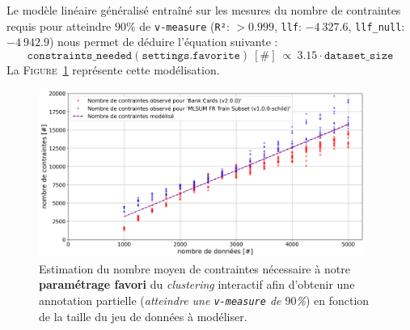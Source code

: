 			Le modèle linéaire généralisé entraîné sur les mesures du nombre de contraintes requis pour atteindre $90$\% de \texttt{v-measure} (\texttt{R²}: $> 0.999$, \texttt{llf}: $-4~327.6$, \texttt{llf\_null}: $-4~942.9$) nous permet de déduire l'équation suivante :
			\begin{equation}
				\label{equation:4.3.3-ETUDE-COUT-NOMBRE-CONTRAINTES}
				\texttt{constraints\_needed}(\texttt{settings.favorite})~[\#]~
				\propto~3.15 \cdot \texttt{dataset\_size}
			\end{equation}
			La \textsc{Figure~\ref{figure:4.3.3-ETUDE-COUT-NOMBRE-CONTRAINTES}} représente cette modélisation.
			\newline
			\begin{figure}[!htb]
				\centering
				\includegraphics[width=0.95\textwidth]{figures/etude-nombre-contraintes-1-modelisation-nombre}
				\caption{
					Estimation du nombre moyen de contraintes nécessaire à notre \textbf{paramétrage favori} du \textit{clustering} interactif afin d'obtenir une annotation partielle (\textit{atteindre une \texttt{v-measure} de $90$\%}) en fonction de la taille du jeu de données à modéliser.
				}
				\label{figure:4.3.3-ETUDE-COUT-NOMBRE-CONTRAINTES}
			\end{figure}
		
